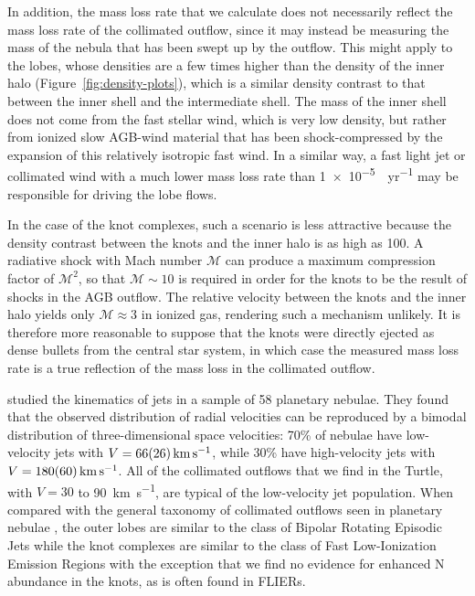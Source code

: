 \documentclass[useAMS, usenatbib]{mnras}
\begin{document}
In addition, the mass loss rate that we calculate does not necessarily reflect the mass loss rate of the collimated outflow,
since it may instead be measuring the mass of the nebula that has been swept up by the outflow.
This might apply to the lobes, whose densities are a few times higher than the density of the inner halo (Figure~\ref{fig:density-plots}),
which is a similar density contrast to that between the inner shell and the intermediate shell.
The mass of the inner shell does not come from the fast stellar wind,
which is very low density,
but rather from ionized slow AGB-wind material that has been shock-compressed by the expansion of this relatively isotropic fast wind.
In a similar way, a fast light jet or collimated wind with a much lower mass loss rate than \SI{1e-5}{\msun.yr^{-1}} may be responsible for driving the lobe flows.

In the case of the knot complexes,
such a scenario is less attractive
because the density contrast between the knots and the inner halo is as high as 100.
A radiative shock with Mach number \(\mathcal{M}\) can produce a maximum compression factor of \(\mathcal{M}^2\),
so that \(\mathcal{M} \sim 10\) is required in order for the knots to be the result of shocks in the AGB outflow.
The relative velocity between the knots and the inner halo yields only \(\mathcal{M} \approx 3\)
in ionized gas,
rendering such a mechanism unlikely.
It is therefore more reasonable to suppose that the knots were directly ejected as dense bullets from the central star system,
in which case the measured mass loss rate is a true reflection of the mass loss in the collimated outflow.

\citet{Guerrero:2020a} studied the kinematics of jets in a sample of 58 planetary nebulae.
They found that the observed distribution of radial velocities can be reproduced by a bimodal distribution of three-dimensional space velocities: 
70\% of nebulae have low-velocity jets with \(V = \SI{66 \pm 26}{km.s^{-1}}\),
while 30\% have high-velocity jets with \(V = \SI{180 \pm 60}{km.s^{-1}}\).
All of the collimated outflows that we find in the Turtle,
with \(V = \num{30}\) to \SI{90}{km.s^{-1}}, are typical of the low-velocity jet population.
When compared with the general taxonomy of collimated outflows seen in planetary nebulae \citep{Lopez:1997a},
the outer lobes are similar to the class of Bipolar Rotating Episodic Jets
\citetext{BRETs, \citealp{Lopez:1993a}}
while the knot complexes are similar to the class of
Fast Low-Ionization Emission Regions \citetext{FLIERs, \citealp{Balick:1994a}}
with the exception that we find no evidence for enhanced N abundance in the knots,
as is often found in FLIERs.
\end{document}

